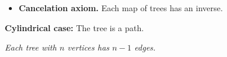 \documentclass{article}
\begin{document}
\begin{itemize}
  \item {\bf Cancelation axiom.} Each map of trees has an inverse.
\end{itemize}

\textbf{Cylindrical case:} The tree is a path.

 {\it Each tree with $n$ vertices has $n-1$ edges.}
\end{document}

